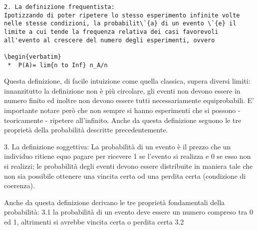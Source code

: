 \documentclass{book}
\begin{document}
\begin{verbatim}
2. La definizione frequentista:
Ipotizzando di poter ripetere lo stesso esperimento infinite volte nelle stesse condizioni, la probabilit\`{a} di un evento \`{e} il limite a cui tende la frequenza relativa dei casi favorevoli all'evento al crescere del numero degli esperimenti, ovvero

\begin{verbatim}
 *	P(A)= lim{n to Inf} n_A/n
\end{verbatim}

Questa definizione, di facile intuizione come quella classica, supera diversi limiti: innanzitutto la definizione non \`{e} più circolare, gli eventi non devono essere in numero finito ed inoltre non devono essere tutti necessariamente equiprobabili.
E' importante notare però che non sempre si hanno esperimenti che si possono - teoricamente - ripetere all'infinito.
Anche da questa definizione seguono le tre propriet\`{a} della probabilit\`{a} descritte precedentemente.

3. La definizione soggettiva:
La probabilit\`{a} di un evento \`{e} il prezzo che un individuo ritiene equo pagare per ricevere 1 se l'evento si realizza e 0 se esso non si realizzi; le probabilit\`{a} degli eventi devono essere distribuite in maniera tale che non sia possibile ottenere una vincita certa od una perdita certa (condizione di coerenza).

Anche da questa definizione derivano le tre propriet\`{a} fondamentali della probabilit\`{a}:
3.1 la probabilit\`{a} di un evento deve essere un numero compreso tra 0 ed 1, altrimenti si avrebbe vincita certa o perdita certa
3.2 
\end{document}
